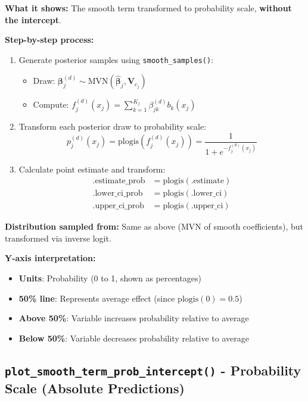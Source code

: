 \documentclass[11pt, a4paper]{article}
\begin{document}
\textbf{What it shows:} The smooth term transformed to probability scale, \textbf{without the intercept}.

\textbf{Step-by-step process:}
\begin{enumerate}
   \item Generate posterior samples using \texttt{smooth\_samples()}:
   \begin{itemize}
       \item Draw: $\boldsymbol{\beta}_j^{(d)} \sim \text{MVN}(\hat{\boldsymbol{\beta}}_j, \mathbf{V}_{c_j})$
       \item Compute: $f_j^{(d)}(x_j) = \sum_{k=1}^{K_j} \beta_{jk}^{(d)} b_k(x_j)$
   \end{itemize}
   \item Transform each posterior draw to probability scale:
   $$p_j^{(d)}(x_j) = \text{plogis}(f_j^{(d)}(x_j)) = \frac{1}{1 + e^{-f_j^{(d)}(x_j)}}$$
   \item Calculate point estimate and transform:
   \begin{align}
   \text{.estimate\_prob} &= \text{plogis}(\text{.estimate}) \\
   \text{.lower\_ci\_prob} &= \text{plogis}(\text{.lower\_ci}) \\
   \text{.upper\_ci\_prob} &= \text{plogis}(\text{.upper\_ci})
   \end{align}
\end{enumerate}

\textbf{Distribution sampled from:} Same as above (MVN of smooth coefficients), but transformed via inverse logit.

\textbf{Y-axis interpretation:}
\begin{itemize}
   \item \textbf{Units}: Probability (0 to 1, shown as percentages)
   \item \textbf{50\% line}: Represents average effect (since $\text{plogis}(0) = 0.5$)
   \item \textbf{Above 50\%}: Variable increases probability relative to average
   \item \textbf{Below 50\%}: Variable decreases probability relative to average
\end{itemize}

\subsection*{\texttt{plot\_smooth\_term\_prob\_intercept()} - Probability Scale (Absolute Predictions)}
\end{document}
